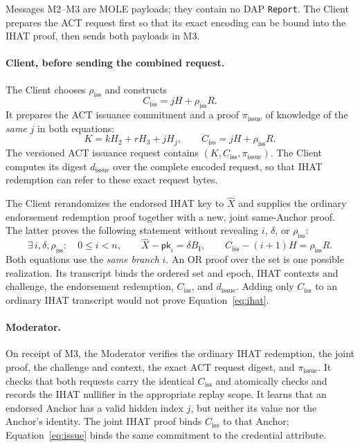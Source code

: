 \documentclass[11pt]{article}
\newcommand{\Ciss}{C_{\mathrm{iss}}}
\begin{document}
Messages M2--M3 are MOLE payloads; they contain no DAP \texttt{Report}.
The Client prepares the ACT request first so that its exact encoding can be
bound into the IHAT proof, then sends both payloads in M3.

\paragraph{Client, before sending the combined request.}
The Client chooses $\rho_{\mathrm{iss}}$ and constructs
\begin{equation}
  \Ciss=jH+\rho_{\mathrm{iss}}R.
\end{equation}
It prepares the ACT issuance commitment and a proof $\pi_{\mathrm{issue}}$
of knowledge of the \emph{same} $j$ in both equations:
\begin{equation}
  K=kH_2+rH_3+jH_j,
  \qquad
  \Ciss=jH+\rho_{\mathrm{iss}}R.
  \label{eq:issue}
\end{equation}
The versioned ACT issuance request contains $(K,\Ciss,\pi_{\mathrm{issue}})$.
The Client computes its digest $d_{\mathrm{issue}}$ over the complete encoded
request, so that IHAT redemption can refer to these exact request bytes.

The Client rerandomizes the endorsed IHAT key to $\widehat X$ and supplies
the ordinary endorsement redemption proof together with a new, joint
same-Anchor proof. The latter proves the following statement without
revealing $i$, $\delta$, or $\rho_{\mathrm{iss}}$:
\begin{equation}
  \exists\,i,\delta,\rho_{\mathrm{iss}}:\quad
  0\leq i<n,\qquad
  \widehat X-\mathsf{pk}_i=\delta B_{\mathrm I},\qquad
  \Ciss-(i+1)H=\rho_{\mathrm{iss}}R.
  \label{eq:ihat}
\end{equation}
Both equations use the \emph{same branch} $i$. An OR proof over the set is
one possible realization. Its transcript binds the ordered set and epoch,
IHAT contexts and challenge, the endorsement redemption, $\Ciss$, and
$d_{\mathrm{issue}}$. Adding only $\Ciss$ to an ordinary IHAT transcript
would not prove Equation~\eqref{eq:ihat}.

\paragraph{Moderator.}
On receipt of M3, the Moderator verifies the ordinary IHAT redemption, the joint proof, the
challenge and context, the exact ACT request digest, and
$\pi_{\mathrm{issue}}$. It checks that both requests carry the identical
$\Ciss$ and atomically checks and records the IHAT nullifier in the
appropriate replay scope. It learns that an endorsed Anchor has a valid
hidden index $j$, but neither its value nor the Anchor's identity. The joint IHAT proof
binds $\Ciss$ to that Anchor; Equation~\eqref{eq:issue} binds the same
commitment to the credential attribute.
\end{document}
